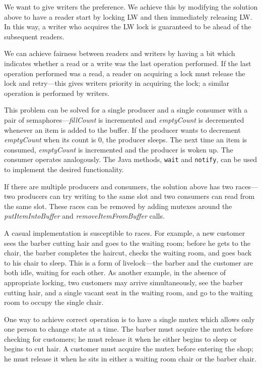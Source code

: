 We want to give writers the preference.  We achieve this by
modifying the solution above to have a reader start by locking LW and
then immediately releasing LW.  In this way, a writer who acquires the 
LW lock is guaranteed to be ahead of the subsequent readers.  

We can achieve fairness between readers and writers by having
a bit which indicates whether a read or a write was the
last operation performed.  If the last operation performed was a read,
a reader on acquiring a lock must release the lock and retry---this gives
writers priority in acquiring the lock; a similar operation is performed
by writers.

This problem can be solved for a single producer and a single consumer with
a pair of semaphores---{\em fillCount} is incremented and {\em emptyCount} is 
decremented whenever an item is added to the buffer.  If the producer
wants to decrement {\em emptyCount} when its count is 0, the producer
sleeps.  The next time an item is consumed, {\em emptyCount} is incremented
and the producer is woken up.  The consumer operates analogously.
The Java methods, \texttt{wait} and \texttt{notify}, can
be used to implement the desired functionality.

If there are multiple producers and consumers, the solution above has two
races---two producers
can try writing to the same slot and two consumers can read from
the same slot.  These races can be removed by adding mutexes around the
{\em putItemIntoBuffer} and {\em removeItemFromBuffer} calls.

A casual implementation is susceptible to races. For example, 
a new customer sees the barber cutting hair and goes to the waiting room;
before he gets to the chair, the barber completes the haircut,
checks the waiting room, and goes back to his chair to sleep.
This is a form of livelock---the barber and the customer are both idle,
waiting for each other.
As another example, in the absence of appropriate locking,
two customers may arrive simultaneously, see the barber
cutting hair, and a single vacant seat in the waiting room, and 
go to the waiting room to occupy the single chair.

One way to achieve correct operation
is to have a single mutex which allows only
one person to change state at a time.
The barber must acquire the mutex before checking 
for customers; he must release it when he either begins to 
sleep or begins to cut hair. A customer must acquire 
the mutex before entering the shop; he must release it when he sits in either 
a waiting room chair or the barber chair. 

